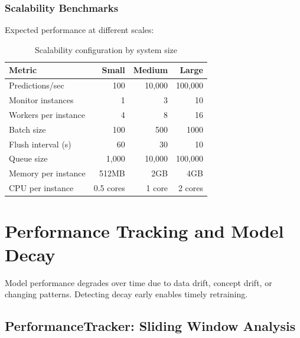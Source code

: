 \subsubsection{Scalability Benchmarks}

Expected performance at different scales:

\begin{table}[h]
\centering
\begin{tabular}{|l|r|r|r|}
\hline
\textbf{Metric} & \textbf{Small} & \textbf{Medium} & \textbf{Large} \\
\hline
Predictions/sec & 100 & 10,000 & 100,000 \\
Monitor instances & 1 & 3 & 10 \\
Workers per instance & 4 & 8 & 16 \\
Batch size & 100 & 500 & 1000 \\
Flush interval (s) & 60 & 30 & 10 \\
Queue size & 1,000 & 10,000 & 100,000 \\
Memory per instance & 512MB & 2GB & 4GB \\
CPU per instance & 0.5 cores & 1 core & 2 cores \\
\hline
\end{tabular}
\caption{Scalability configuration by system size}
\end{table}

\section{Performance Tracking and Model Decay}

Model performance degrades over time due to data drift, concept drift, or changing patterns. Detecting decay early enables timely retraining.

\subsection{PerformanceTracker: Sliding Window Analysis}

